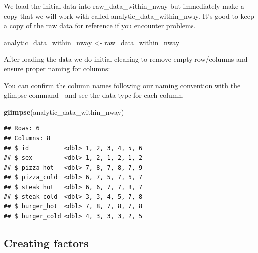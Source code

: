 \documentclass[
]{krantz}
\makeatletter
\newenvironment{Shaded}{\begin{snugshade}}{\end{snugshade}}
\newcommand{\CommentTok}[1]{\textcolor[rgb]{0.37,0.37,0.37}{\textit{#1}}}
\newcommand{\KeywordTok}[1]{\textcolor[rgb]{0.27,0.27,0.27}{\textbf{#1}}}
\newcommand{\NormalTok}[1]{#1}
\newcommand{\OperatorTok}[1]{\textcolor[rgb]{0.43,0.43,0.43}{\textbf{#1}}}
\newcommand{\StringTok}[1]{\textcolor[rgb]{0.5,0.5,0.5}{#1}}
\newenvironment{kframe}{%
\medskip{}
\setlength{\fboxsep}{.8em}
 \def\at@end@of@kframe{}%
 \ifinner\ifhmode%
  \def\at@end@of@kframe{\end{minipage}}%
  \begin{minipage}{\columnwidth}%
 \fi\fi%
 \def\FrameCommand##1{\hskip\@totalleftmargin \hskip-\fboxsep
 \colorbox{shadecolor}{##1}\hskip-\fboxsep
     \hskip-\linewidth \hskip-\@totalleftmargin \hskip\columnwidth}%
 \MakeFramed {\advance\hsize-\width
   \@totalleftmargin\z@ \linewidth\hsize
   \@setminipage}}%
 {\par\unskip\endMakeFramed%
 \at@end@of@kframe}
\renewenvironment{Shaded}{\begin{kframe}}{\end{kframe}}
\makeatother
\begin{document}
We load the initial data into raw\_data\_within\_nway but immediately make a copy that we will work with called analytic\_data\_within\_nway. It's good to keep a copy of the raw data for reference if you encounter problems.

\begin{Shaded}
\begin{Highlighting}[]
\NormalTok{analytic_data_within_nway <-}\StringTok{ }\NormalTok{raw_data_within_nway}
\end{Highlighting}
\end{Shaded}

After loading the data we do initial cleaning to remove empty row/columns and ensure proper naming for columns:

\begin{Shaded}
\end{Shaded}

You can confirm the column names following our naming convention with the glimpse command - and see the data type for each column.

\begin{Shaded}
\begin{Highlighting}[]
\KeywordTok{glimpse}\NormalTok{(analytic_data_within_nway)}
\end{Highlighting}
\end{Shaded}

\begin{verbatim}
## Rows: 6
## Columns: 8
## $ id          <dbl> 1, 2, 3, 4, 5, 6
## $ sex         <dbl> 1, 2, 1, 2, 1, 2
## $ pizza_hot   <dbl> 7, 8, 7, 8, 7, 9
## $ pizza_cold  <dbl> 6, 7, 5, 7, 6, 7
## $ steak_hot   <dbl> 6, 6, 7, 7, 8, 7
## $ steak_cold  <dbl> 3, 3, 4, 5, 7, 8
## $ burger_hot  <dbl> 7, 8, 7, 8, 7, 8
## $ burger_cold <dbl> 4, 3, 3, 3, 2, 5
\end{verbatim}

\hypertarget{creating-factors-2}{%
\subsection{Creating factors}\label{creating-factors-2}}
\end{document}
